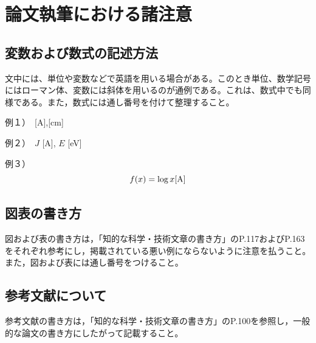 \documentclass{jreport}		%
\begin{document}
\section{論文執筆における諸注意}
\subsection{変数および数式の記述方法}
文中には、単位や変数などで英語を用いる場合がある。このとき単位、数学記号にはローマン体、変数には斜体を用いるのが通例である。これは、数式中でも同様である。また，数式には通し番号を付けて整理すること。\par
例１）　[A],[cm] \par
例２）　$J$ [A], $E$ [eV] \par
例３）
\begin{equation}
f(x) = \log x {\rm [A]}  
\end{equation}

\subsection{図表の書き方}%
図および表の書き方は，「知的な科学・技術文章の書き方」のP.117およびP.163をそれぞれ参考にし，掲載されている悪い例にならないように注意を払うこと。また，図および表には通し番号をつけること。

\subsection{参考文献について}
参考文献の書き方は，「知的な科学・技術文章の書き方」のP.100を参照し，一般的な論文の書き方にしたがって記載すること。
\end{document}

